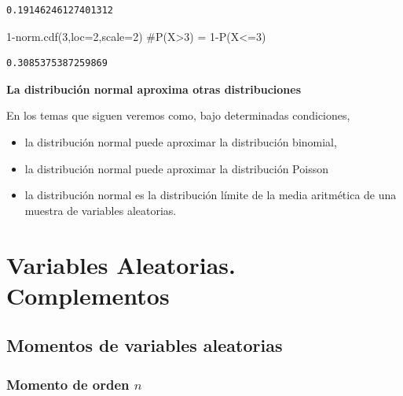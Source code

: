 \documentclass[
  letterpaper,
  DIV=11,
  numbers=noendperiod]{scrreprt}
\newenvironment{Shaded}{\begin{snugshade}}{\end{snugshade}}
\newcommand{\CommentTok}[1]{\textcolor[rgb]{0.37,0.37,0.37}{#1}}
\newcommand{\DecValTok}[1]{\textcolor[rgb]{0.68,0.00,0.00}{#1}}
\newcommand{\NormalTok}[1]{\textcolor[rgb]{0.00,0.23,0.31}{#1}}
\newcommand{\OperatorTok}[1]{\textcolor[rgb]{0.37,0.37,0.37}{#1}}
\providecommand{\tightlist}{%
  \setlength{\itemsep}{0pt}\setlength{\parskip}{0pt}}\usepackage{longtable,booktabs,array}
\begin{document}
\begin{verbatim}
0.19146246127401312
\end{verbatim}

\begin{Shaded}
\begin{Highlighting}[]
\DecValTok{1}\OperatorTok{{-}}\NormalTok{norm.cdf(}\DecValTok{3}\NormalTok{,loc}\OperatorTok{=}\DecValTok{2}\NormalTok{,scale}\OperatorTok{=}\DecValTok{2}\NormalTok{) }\CommentTok{\#P(X\textgreater{}3) = 1{-}P(X\textless{}=3)}
\end{Highlighting}
\end{Shaded}

\begin{verbatim}
0.3085375387259869
\end{verbatim}

\textbf{La distribución normal aproxima otras distribuciones}

En los temas que siguen veremos como, bajo determinadas condiciones,

\begin{itemize}
\tightlist
\item
  la distribución normal puede aproximar la distribución binomial,
\item
  la distribución normal puede aproximar la distribución Poisson
\item
  la distribución normal es la distribución límite de la media
  aritmética de una muestra de variables aleatorias.
\end{itemize}


\hypertarget{variables-aleatorias.-complementos}{%
\chapter{Variables Aleatorias.
Complementos}\label{variables-aleatorias.-complementos}}

\hypertarget{momentos-de-variables-aleatorias}{%
\section{Momentos de variables
aleatorias}\label{momentos-de-variables-aleatorias}}

\hypertarget{momento-de-orden-n}{%
\subsection{\texorpdfstring{Momento de orden
\(n\)}{Momento de orden n}}\label{momento-de-orden-n}}
\end{document}

